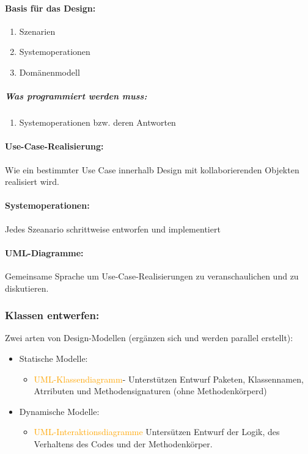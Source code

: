\documentclass[../ZF_SWEN1.tex]{subfiles}
\begin{document}
\paragraph{Basis für das Design: }
\begin{enumerate}
	\item Szenarien
	\item Systemoperationen
	\item Domänenmodell
\end{enumerate}

\subparagraph{Was programmiert werden muss: }
\begin{enumerate}
	\item Systemoperationen bzw. deren Antworten
\end{enumerate}


\paragraph{Use-Case-Realisierung: } Wie ein bestimmter Use Case innerhalb Design mit kollaborierenden Objekten realisiert wird.

\paragraph{Systemoperationen: } Jedes Szeanario schrittweise entworfen und implementiert

\paragraph{UML-Diagramme: } Gemeinsame Sprache um Use-Case-Realisierungen zu veranschaulichen und zu diskutieren.


\subsubsection{Klassen entwerfen: }
Zwei arten von Design-Modellen (ergänzen sich und werden parallel erstellt):
\begin{itemize}
	\item Statische Modelle:
	\begin{itemize}
		\item \textcolor {orange}{UML-Klassendiagramm}- Unterstützen Entwurf Paketen, Klassennamen, Atrributen und Methodensignaturen (ohne Methodenkörperd)
	\end{itemize}
	\item Dynamische Modelle:
	\begin{itemize}
		\item \textcolor {orange} {UML-Interaktionsdiagramme} Untersützen Entwurf der Logik, des Verhaltens des Codes und der Methodenkörper.
	\end{itemize}	
\end{itemize}
\end{document}

